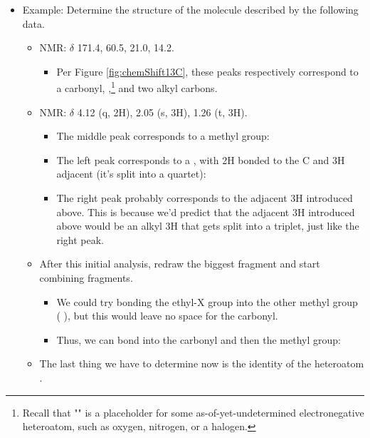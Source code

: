 \documentclass[../notes.tex]{subfiles}
\begin{document}
\begin{itemize}
    \item Example: Determine the structure of the molecule described by the following data.
    \begin{itemize}
        \item {} NMR: $\delta$ 171.4, 60.5, 21.0, 14.2.
        \begin{itemize}
            \item Per Figure \ref{fig:chemShift13C}, these peaks respectively correspond to a carbonyl, ,\footnote{Recall that "" is a placeholder for some as-of-yet-undetermined electronegative heteroatom, such as oxygen, nitrogen, or a halogen.} and two alkyl carbons.
        \end{itemize}
        \item {} NMR: $\delta$ 4.12 (q, 2H), 2.05 (s, 3H), 1.26 (t, 3H).
        \begin{itemize}
            \item The middle peak corresponds to a methyl group: {\tiny{}}
            \item The left peak corresponds to a , with 2H bonded to the C and 3H adjacent (it's split into a quartet): {\tiny{}}
            \item The right peak probably corresponds to the adjacent 3H introduced above. This is because we'd predict that the adjacent 3H introduced above would be an alkyl 3H that gets split into a triplet, just like the right peak.
        \end{itemize}
        \item After this initial analysis, redraw the biggest fragment and start combining fragments.
        \begin{itemize}
            \item We could try bonding the ethyl-X group into the other methyl group (\,{\tiny{}}\,), but this would leave no space for the carbonyl.
            \item Thus, we can bond into the carbonyl and then the methyl group: {\tiny{}}
        \end{itemize}
        \item The last thing we have to determine now is the identity of the heteroatom .

\end{itemize}
\end{itemize}
\end{document}
